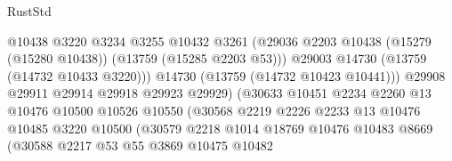 \begin{lexlean}{RustStd}
\begin{coremodule}
                                          @10438
                                          @3220
                                          @3234
                                          @3255
                                          @10432
                                          @3261
                                          (@29036
                                            @2203
                                            @10438
                                            (@15279 (@15280 @10438))
                                            (@13759 (@15285 @2203 @53)))
                                          @29003
                                          @14730
                                          (@13759 (@14732 @10433 @3220)))
                                        @14730
                                        (@13759 (@14732 @10423 @10441)))
                                      @29908
                                      @29911
                                      @29914
                                      @29918
                                      @29923
                                      @29929)
                                    (@30633
                                      @10451
                                      @2234
                                      @2260
                                      @13
                                      @10476
                                      @10500
                                      @10526
                                      @10550
                                      (@30568
                                        @2219
                                        @2226
                                        @2233
                                        @13
                                        @10476
                                        @10485
                                        @3220
                                        @10500
                                        (@30579
                                          @2218
                                          @1014
                                          @18769
                                          @10476
                                          @10483
                                          @8669
                                          (@30588
                                            @2217
                                            @53
                                            @55
                                            @3869
                                            @10475
                                            @10482

\end{coremodule}
\end{lexlean}
